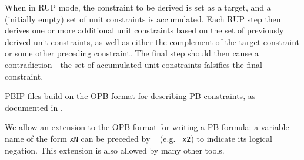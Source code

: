 \documentclass{fmcad}
\begin{document}
When in RUP mode, the constraint to be derived is set as a target, and a (initially empty) set of unit
constraints is accumulated. Each RUP step then derives one or more additional unit constraints based
on the set of previously derived unit constraints, as well as either the complement of the target
constraint or some other preceding constraint. The final step should then cause a contradiction - the
set of accumulated unit constraints falsifies the final constraint.

PBIP files build on the OPB format for describing PB constraints, as documented in \cite{roussel2012input}.

We allow an extension to the OPB format for writing a PB formula: a variable name of the form
\texttt{xN} can be preceded by \texttt{~} (e.g. \texttt{~x2}) to indicate its logical negation.
This extension is also allowed by many other tools.
\end{document}
